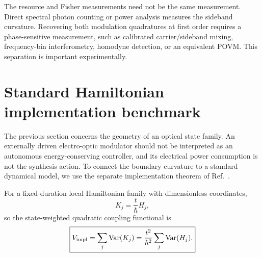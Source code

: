 \documentclass[aps,pra,reprint,superscriptaddress,longbibliography]{revtex4-2}
\begin{document}
The resource and Fisher measurements need not be the same measurement. Direct spectral photon counting or power analysis measures the sideband curvature. Recovering both modulation quadratures at first order requires a phase-sensitive measurement, such as calibrated carrier/sideband mixing, frequency-bin interferometry, homodyne detection, or an equivalent POVM. This separation is important experimentally.

\section{Standard Hamiltonian implementation benchmark}

The previous section concerns the geometry of an optical state family. An externally driven electro-optic modulator should not be interpreted as an autonomous energy-conserving controller, and its electrical power consumption is not the synthesis action. To connect the boundary curvature to a standard dynamical model, we use the separate implementation theorem of Ref.~\cite{CompanionUnitaryCost2026}.

For a fixed-duration local Hamiltonian family with dimensionless coordinates,
\begin{equation}
K_j=\frac{t}{\hbar}H_j,
\end{equation}
so the state-weighted quadratic coupling functional is
\begin{equation}
\boxed{
V_{\rm impl}
=\sum_j\operatorname{Var}(K_j)
=\frac{t^2}{\hbar^2}\sum_j\operatorname{Var}(H_j).}
\label{eq:Vimpl_H}
\end{equation}
\end{document}
